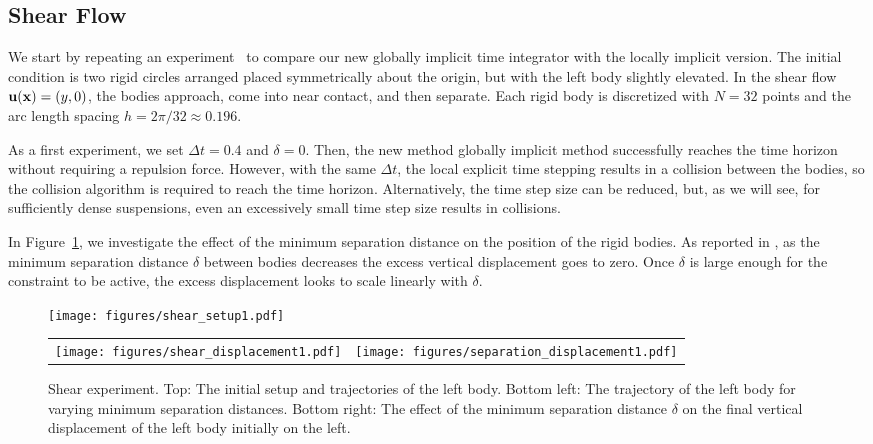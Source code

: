 \documentclass[preprint, 10pt]{elsarticle}
\begin{document}
\subsection{Shear Flow}
We start by repeating an experiment~\cite{Lu2017} to compare our new
globally implicit time integrator with the locally implicit version.
The initial condition is two rigid circles arranged placed symmetrically
about the origin, but with the left body slightly elevated.  In the
shear flow ${{\mathbf{u}}}({\mathbf{x}}) = (y,0)$, the bodies approach, come into near
contact, and then separate.  Each rigid body is discretized with $N=32$
points and the arc length spacing $h = 2\pi/32 \approx 0.196$.  

As a first experiment, we set $\Delta t = 0.4$ and $\delta = 0$.  Then,
the new method globally implicit method successfully reaches the time
horizon without requiring a repulsion force.  However, with the same
$\Delta t$, the local explicit time stepping results in a collision
between the bodies, so the collision algorithm is required to reach
the time horizon.  Alternatively, the time step size can be reduced,
but, as we will see, for sufficiently dense suspensions, even an
excessively small time step size results in collisions.

In Figure~\ref{fig:shear_experiment}, we investigate the effect of the
minimum separation distance on the position of the rigid bodies.  As
reported in \cite{Lu2017}, as the minimum separation  distance  $\delta$
between bodies decreases the excess vertical displacement goes to zero. Once $\delta$ is large enough for the constraint to be active, the excess displacement looks to scale linearly with $\delta$.

\begin{figure}[!h]
  \begin{center}
    \texttt{[image: figures/shear\_setup1.pdf]}
    \begin{tabular}{c c}
      \texttt{[image: figures/shear\_displacement1.pdf]} &
      \texttt{[image: figures/separation\_displacement1.pdf]}
    \end{tabular}
  \end{center}
\caption{\label{fig:shear_experiment} Shear experiment. Top: The initial
setup and trajectories of the left body.   Bottom left: The trajectory
of the left body for varying minimum separation distances.  Bottom
right: The effect of the minimum separation distance $\delta$ on the
final vertical displacement of the left body initially on the left.}
\end{figure}
\end{document}
